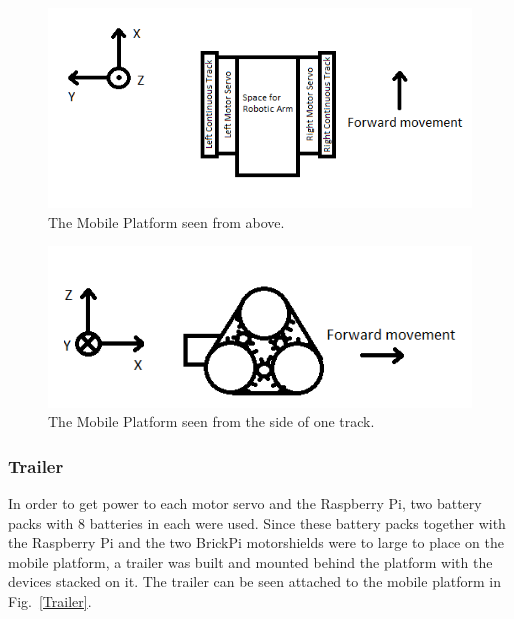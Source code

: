 \begin{figure}[h]
    \centering
    \includegraphics[width=\textwidth]{sections/assets/Mobile_platform_paint_text3_horiz.PNG}
    \caption{The Mobile Platform seen from above.}
    \label{Mobile_platform_paint_}
\end{figure}


\begin{figure}[h]
    \centering
    \includegraphics[width =\textwidth]{sections/assets/Band_platform_coordinates.PNG}
    \caption{The Mobile Platform seen from the side of one track.}
    \label{Band_platform_coordinates}
\end{figure}

\subsubsection{Trailer}
In order to get power to each motor servo and the Raspberry Pi, two battery packs with 8 batteries in each were used. Since these battery packs together with the Raspberry Pi and the two BrickPi motorshields were to large to place on the mobile platform, a trailer was built and mounted behind the platform with the devices stacked on it. The trailer can be seen attached to the mobile platform in Fig.~\ref{Trailer}.


